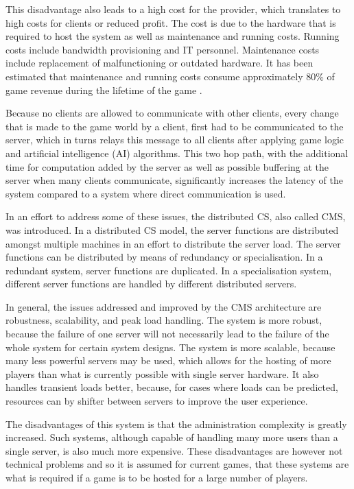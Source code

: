 \documentclass[journal,oneside,a4paper,onecolumn]{IEEEtran}
\begin{document}
This disadvantage also leads to a high cost for the provider, which translates to high costs for clients or reduced profit. The cost is due to the hardware that is required to host the system as well as maintenance and running costs. Running costs include bandwidth provisioning and IT personnel. Maintenance costs include replacement of malfunctioning or outdated hardware. It has been estimated that maintenance and running costs consume approximately 80\% of game revenue during the lifetime of the game \cite{cs_mmog_cost}.

Because no clients are allowed to communicate with other clients, every change that is made to the game world by a client, first had to be communicated to the server, which in turns relays this message to all clients after applying game logic and artificial intelligence (AI) algorithms. This two hop path, with the additional time for computation added by the server as well as possible buffering at the server when many clients communicate, significantly increases the latency of the system compared to a system where direct communication is used.

In an effort to address some of these issues, the distributed \ac{CS}, also called \ac{CMS}, was introduced. In a distributed \ac{CS} model, the server functions are distributed amongst multiple machines in an effort to distribute the server load. The server functions can be distributed by means of redundancy or specialisation. In a redundant system, server functions are duplicated. In a specialisation system, different server functions are handled by different distributed servers.

In general, the issues addressed and improved by the \ac{CMS} architecture are robustness, scalability, and peak load handling. The system is more robust, because the failure of one server will not necessarily lead to the failure of the whole system for certain system designs. The system is more scalable, because many less powerful servers may be used, which allows for the hosting of more players than what is currently possible with single server hardware. It also handles transient loads better, because, for cases where loads can be predicted, resources can by shifter between servers to improve the user experience.

The disadvantages of this system is that the administration complexity is greatly increased. Such systems, although capable of handling many more users than a single server, is also much more expensive. These disadvantages are however not technical problems and so it is assumed for current games, that these systems are what is required if a game is to be hosted for a large number of players.
\end{document}
